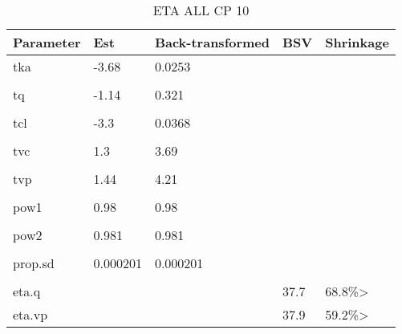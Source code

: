 \begin{table}
\centering\centering
\caption{ETA ALL CP 10}
\centering
\fontsize{8}{10}\selectfont
\begin{tabular}[t]{lllll}
\toprule
\textbf{Parameter} & \textbf{Est} & \textbf{Back-transformed} & \textbf{BSV} & \textbf{Shrinkage}\\
\midrule
tka & -3.68 & 0.0253 &  & \\
\midrule\\
tq & -1.14 & 0.321 &  & \\
\midrule\\
tcl & -3.3 & 0.0368 &  & \\
\midrule\\
tvc & 1.3 & 3.69 &  & \\
\midrule\\
tvp & 1.44 & 4.21 &  & \\
\midrule\\
pow1 & 0.98 & 0.98 &  & \\
\midrule\\
pow2 & 0.981 & 0.981 &  & \\
\midrule\\
prop.sd & 0.000201 & 0.000201 &  & \\
\midrule\\
eta.q &  &  & 37.7 & 68.8\%>\\
\midrule
eta.vp &  &  & 37.9 & 59.2\%>\\
\bottomrule
\end{tabular}
\end{table}